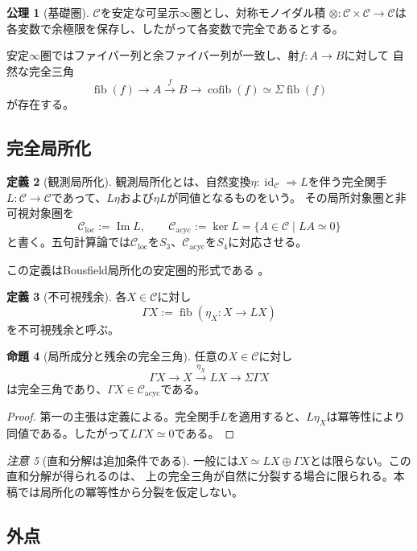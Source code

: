\documentclass[11pt,a4paper]{ltjsarticle}
\theoremstyle{definition}
\newtheorem{definition}{定義}[section]
\newtheorem{axiom}[definition]{公理}
\newtheorem{proposition}[definition]{命題}
\theoremstyle{remark}
\newtheorem{remark}[definition]{注意}
\newcommand{\C}{\mathcal{C}}
\newcommand{\Cloc}{\mathcal{C}_{\mathrm{loc}}}
\newcommand{\Cacyc}{\mathcal{C}_{\mathrm{acyc}}}
\newcommand{\id}{\operatorname{id}}
\newcommand{\fib}{\operatorname{fib}}
\newcommand{\cofib}{\operatorname{cofib}}
\newcommand{\im}{\operatorname{Im}}
\newcommand{\Residual}{\Gamma}
\begin{document}
\begin{axiom}[基礎圏]
$\C$を安定な可呈示$\infty$圏とし、対称モノイダル積
$\otimes:\C\times\C\to\C$は各変数で余極限を保存し、したがって各変数で完全であるとする。
\end{axiom}

安定$\infty$圏ではファイバー列と余ファイバー列が一致し、射$f:A\to B$に対して
自然な完全三角
\[
 \fib(f)\longrightarrow A\xrightarrow{f}B
 \longrightarrow\cofib(f)\simeq\Sigma\fib(f)
\]
が存在する\cite{LurieHA}。

\subsection{完全局所化}

\begin{definition}[観測局所化]
観測局所化とは、自然変換$\eta:\id_{\C}\Rightarrow L$を伴う完全関手
$L:\C\to\C$であって、$L\eta$および$\eta L$が同値となるものをいう。
その局所対象圏と非可視対象圏を
\[
 \Cloc:=\im L,
 \qquad
 \Cacyc:=\ker L=\{A\in\C\mid LA\simeq0\}
\]
と書く。五句計算論では$\Cloc$を$S_3$、$\Cacyc$を$S_4$に対応させる。
\end{definition}

この定義はBousfield局所化の安定圏的形式である
\cite{Lawson2022,Mantovani2024}。

\begin{definition}[不可視残余]
各$X\in\C$に対し
\[
 \Residual X:=\fib(\eta_X:X\to LX)
\]
を不可視残余と呼ぶ。
\end{definition}

\begin{proposition}[局所成分と残余の完全三角]
任意の$X\in\C$に対し
\[
 \Residual X\longrightarrow X\xrightarrow{\eta_X}LX
 \longrightarrow\Sigma\Residual X
\]
は完全三角であり、$\Residual X\in\Cacyc$である。
\end{proposition}

\begin{proof}
第一の主張は定義による。完全関手$L$を適用すると、$L\eta_X$は冪等性により
同値である。したがって$L\Residual X\simeq0$である。
\end{proof}

\begin{remark}[直和分解は追加条件である]
一般には$X\simeq LX\oplus\Residual X$とは限らない。この直和分解が得られるのは、
上の完全三角が自然に分裂する場合に限られる。本稿では局所化の冪等性から分裂を仮定しない。
\end{remark}

\subsection{外点}
\end{document}
